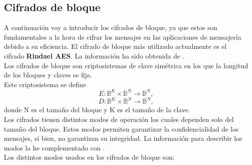 \subsection{Cifrados de bloque}
A continuación voy a introducir los cifrados de bloque, ya que estos son fundamentales a la hora de cifrar los mensajes en las aplicaciones de mensajería debido a su eficiencia. El cifrado de bloque más utilizado actualmente es el cifrado \textbf{Rindael AES}. La información ha sido obtenida de \cite{apuntesCriptografia}.\\
Los cifrados de bloque son criptosistemas de clave simétrica en los que la longitud de los bloques y claves es fija.\\
Este criptosistema se define
$$
	E:\mathbb{B}^K\times\mathbb{B}^N\rightarrow \mathbb{B}^N,
$$
$$
	D:\mathbb{B}^K\times\mathbb{B}^N\rightarrow \mathbb{B}^N,
$$
donde N es el tamaño del bloque y K es el tamaño de la clave.\\
Los cifrados tienen distintos modos de operación los cuales dependen solo del tamaño del bloque. Estos modos permiten garantizar la confidencialidad de los mensajes, si bien, no garantizan su integridad. La información para describir los modos la he complementado con \cite{bloquenuevo}.\\ 
Los distintos modos usados en los cifrados de bloque son:\\
